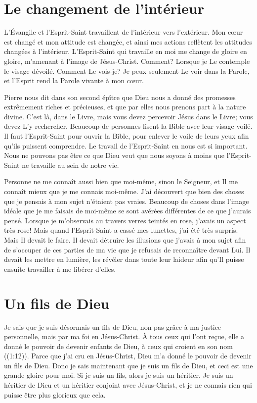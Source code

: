 \section*{Le changement de l'intérieur}

L'Évangile et l'Esprit-Saint travaillent de l'intérieur vers l'extérieur.
 Mon cœur est changé et mon attitude est changée,
 et ainsi mes actions reflètent les attitudes changées à l'intérieur.
 L'Esprit-Saint qui travaille en moi me change de gloire en gloire,
 m'amenant à l'image de Jésus-Christ. Comment?
 Lorsque je Le contemple le visage dévoilé.
 Comment Le vois-je? Je peux seulement Le voir dans la Parole,
 et l'Esprit rend la Parole vivante à mon cœur.

Pierre nous dit dans son second épître que Dieu nous a donné
 des promesses extrêmement riches et précieuses,
 et que par elles nous prenons part à la nature divine.
 C'est là, dans le Livre, mais vous devez percevoir Jésus dans le Livre;
 vous devez L'y rechercher.
 Beaucoup de personnes lisent la Bible avec leur visage voilé.
 Il faut l'Esprit-Saint pour ouvrir la Bible, pour enlever le voile
 de leurs yeux afin qu'ils puissent comprendre.
 Le travail de l'Esprit-Saint en nous est si important.
 Nous ne pouvons pas être ce que Dieu veut que nous soyons
 à moins que l'Esprit-Saint ne travaille au sein de notre vie.

Personne ne me connaît aussi bien que moi-même, sinon le Seigneur,
 et Il me connaît mieux que je me connais moi-même.
 J'ai découvert que bien des choses que je pensais
 à mon sujet n'étaient pas vraies.
 Beaucoup de choses dans l'image idéale que je me faisais de moi-même
 se sont avérées différentes de ce que j'aurais pensé.
 Lorsque je m'observais au travers verres teintés en rose,
 j'avais un aspect très rose!
 Mais quand l'Esprit-Saint a cassé mes lunettes,
 j'ai été très surpris. Mais Il devait le faire.
 Il devait détruire les illusions que j'avais à mon sujet afin de s'occuper
 de ces parties de ma vie que je refusais de reconnaître devant Lui.
 Il devait les mettre en lumière, les révéler dans toute leur laideur
 afin qu'Il puisse ensuite travailler à me libérer d'elles.


\section*{Un fils de Dieu}

Je sais que je suis désormais un fils de Dieu,
 non pas grâce à ma justice personnelle,
 mais par ma foi en Jésus-Christ.
 \og À tous ceux qui l'ont reçue, elle a donné le pouvoir
 de devenir enfants de Dieu,
 à ceux qui croient en son nom \fg{} ((1:12)).
 Parce que j'ai cru en Jésus-Christ, Dieu m'a donné le pouvoir
 de devenir un fils de Dieu.
 Donc je sais maintenant que je suis un fils de Dieu,
 et ceci est une grande gloire pour moi.
 Si je suis un fils, alors je suis un héritier.
 Je suis un héritier de Dieu et un héritier conjoint avec Jésus-Christ,
 et je ne connais rien qui puisse être plus glorieux que cela.

